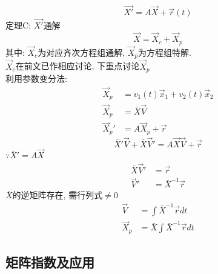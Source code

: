 \[\vec{X'} = A \vec{X} + \vec{r}(t) \]
定理C: $\vec{X'}$通解
\[ \vec{X} = \vec{X}_c + \vec{X}_p \]
其中: $\vec{X}_c$为对应齐次方程组通解, $\vec{X}_p$为方程组特解.\\
$\vec{X}_c$在前文已作相应讨论, 下重点讨论$\vec{X}_p$\\[1em]
利用参数变分法:
\begin{align*}
    \vec{X}_p &= v_1(t) \vec{x}_1 + v_2(t) \vec{x}_2 \\
    \vec{X}_p &= \bar{X}  \vec{V} \\
    \vec{X}_p' &= A \vec{X}_p + \vec{r} 
\end{align*}
\[
    \bar{X}'\vec{V} + \bar{X}\vec{V}'=A \vec{X}\vec{V} + \vec{r}
\]
$\because \bar{X}'= A \vec{X}$
\begin{align*}
    \bar{X}\vec{V}' &= \vec{r} \\
    \vec{V}' &= \bar{X}^{-1} \vec{r}
\end{align*}
$\bar{X}$的逆矩阵存在, 需行列式$\neq 0$
\begin{align*}
    \vec{V} &=  \int \bar{X}^{-1} \vec{r} dt \\
    \vec{X}_p &= \bar{X} \int \bar{X}^{-1} \vec{r} dt
\end{align*}

\newpage
\subsection{\LARGE \hspace*{0.1em}矩阵指数及应用}

